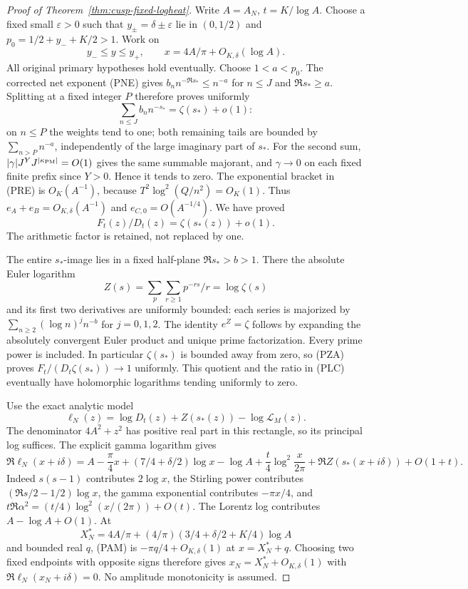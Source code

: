 \documentclass[11pt]{article}
\theoremstyle{remark}\newtheorem{remark}[theorem]{Remark}
\begin{document}
\begin{proof}[Proof of Theorem~\ref{thm:cusp-fixed-logheat}]
Write $A=A_N$, $t=K/\log A$. Choose a fixed small $\varepsilon>0$
such that $y_\pm=\delta\pm\varepsilon$ lie in $(0,1/2)$ and
$p_0=1/2+y_-+K/2>1$. Work on
\[
 y_-\le y\le y_+,\qquad x=4A/\pi+O_{K,\delta}(\log A).
\]
All original primary hypotheses hold eventually. Choose $1<a<p_0$.
The corrected net exponent (PNE) gives
$b_n n^{-\Re s_*}\le n^{-a}$ for $n\le J$ and $\Re s_*\ge a$.
Splitting at a fixed integer $P$ therefore proves uniformly
\[
 \sum_{n\le J}b_n n^{-s_*}=\zeta(s_*)+o(1):
\]
on $n\le P$ the weights tend to one; both remaining tails are
bounded by $\sum_{n>P}n^{-a}$, independently of the large imaginary
part of $s_*$. For the second sum,
$|\gamma|J^YJ^{|\kappa_{\rm PM}|}=O(1)$ gives the same summable
majorant, and $\gamma\to0$ on each fixed finite prefix since $Y>0$.
Hence it tends to zero. The exponential bracket in (PRE) is
$O_K(A^{-1})$, because $T^2\log^2(Q/n^2)=O_K(1)$.
Thus $e_A+e_B=O_{K,\delta}(A^{-1})$ and $e_{C,0}=O(A^{-1/4})$.
We have proved
\[
 F_t(z)/D_t(z)=\zeta(s_*(z))+o(1).                      \tag{PZA}
\]
The arithmetic factor is retained, not replaced by one.

The entire $s_*$-image lies in a fixed half-plane $\Re s_*>b>1$.
There the absolute Euler logarithm
\[
 Z(s)=\sum_p\sum_{r\ge1}p^{-rs}/r=\log\zeta(s)          \tag{EZH}
\]
and its first two derivatives are uniformly bounded: each series
is majorized by $\sum_{n\ge2}(\log n)^j n^{-b}$ for $j=0,1,2$.
The identity $e^Z=\zeta$ follows by expanding the absolutely
convergent Euler product and unique prime factorization.
Every prime power is included. In particular $\zeta(s_*)$ is bounded
away from zero, so (PZA) proves
$F_t/(D_t\zeta(s_*))\to1$ uniformly. This quotient and the ratio in
(PLC) eventually have holomorphic logarithms tending uniformly to zero.

Use the exact analytic model
\[
 \ell_N(z)=\log D_t(z)+Z(s_*(z))-\log\mathcal L_M(z).    \tag{PMO}
\]
The denominator $4A^2+z^2$ has positive real part in this rectangle,
so its principal log suffices. The explicit gamma logarithm gives
\[
 \Re\ell_N(x+i\delta)
  =A-\frac\pi4x+(7/4+\delta/2)\log x-\log A
     +\frac t4\log^2\frac{x}{2\pi}
     +\Re Z(s_*(x+i\delta))+O(1+t).                    \tag{PAM}
\]
Indeed $s(s-1)$ contributes $2\log x$, the Stirling power contributes
$(\Re s/2-1/2)\log x$, the gamma exponential contributes $-\pi x/4$,
and $t\Re\alpha^2=(t/4)\log^2(x/(2\pi))+O(t)$.
The Lorentz log contributes $A-\log A+O(1)$.
At
\[
 X_N^*=4A/\pi+(4/\pi)(3/4+\delta/2+K/4)\log A
\]
and bounded real $q$, (PAM) is $-\pi q/4+O_{K,\delta}(1)$
at $x=X_N^*+q$. Choosing two fixed endpoints with opposite signs
therefore gives $x_N=X_N^*+O_{K,\delta}(1)$ with
$\Re\ell_N(x_N+i\delta)=0$. No amplitude monotonicity is assumed.


\end{proof}
\end{document}
